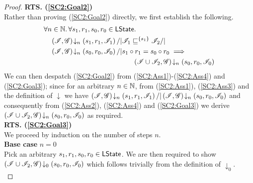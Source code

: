 \begin{lemma}
\begin{proof}
\noindent\textbf{RTS. (\ref{SC2:Goal2})} \\
Rather than proving (\ref{SC2:Goal2}) directly, we first establish the following.
%
\begin{align}
	& \for {n \in \Nats} \for{s_1, r_1, s_0, r_0 \in \LStates} \nonumber\\
	& \quad \extendsAMUpto{\lmod, \gmod}{n}{s_1}{r_1}{\lmod_1} /| \lmod_1 \weakenI{\{s_1\}} \lmod_2 /| \nonumber\\
	& \quad \extendsAMUpto{\lmod, \gmod}{n}{s_0}{r_0}{\lmod_0} /| s_1 \composeL r_1 = s_0 \composeL r_0 \implies \nonumber\\
	& & \hspace{-3cm}  \extendsAMUpto{\lmod \cup \lmod_2, \gmod}{n}{s_0}{r_0}{\lmod_0} \label{SC2:Goal3}
\end{align}
%
We can then despatch (\ref{SC2:Goal2}) from (\ref{SC2:Ass1})-(\ref{SC2:Ass4}) and (\ref{SC2:Goal3}); since for an arbitrary $n \in \mathbb{N}$, from (\ref{SC2:Ass1}), (\ref{SC2:Ass3}) and the definition of $\downarrow$ we have $\left(\mathscr{I}, \mathscr{G}\right) \!\downarrow_{n} \left(s_1, r_1, \mathscr{I}_1\right) /| \left(\mathscr{I}, \mathscr{G}\right) \!\downarrow_{n} \left(s_0, r_0, \mathscr{I}_0\right)$ and consequently from (\ref{SC2:Ass2}), (\ref{SC2:Ass4}) and (\ref{SC2:Goal3}) we derive $\left(\mathscr{I} \cup \mathscr{I}_2, \mathscr{G}\right) \!\downarrow_{n} \left(s_0, r_0, \mathscr{I}_0\right) $ as required. \\

\noindent\textbf{RTS. (\ref{SC2:Goal3})} \\
We proceed by induction on the number of steps $n$.\\

\noindent\textbf{Base case }$n=0$\\
Pick an arbitrary $s_1, r_1, s_0, r_0 \in \textsf{LState}$. We are then required to show	$\left(\mathscr{I} \cup \mathscr{I}_2, \mathscr{G}\right) \!\downarrow_{0} \left(s_0, r_0, \mathscr{I}_0\right) $ which follows trivially from the definition of $\downarrow_0$.\\



\end{proof}
\end{lemma}
